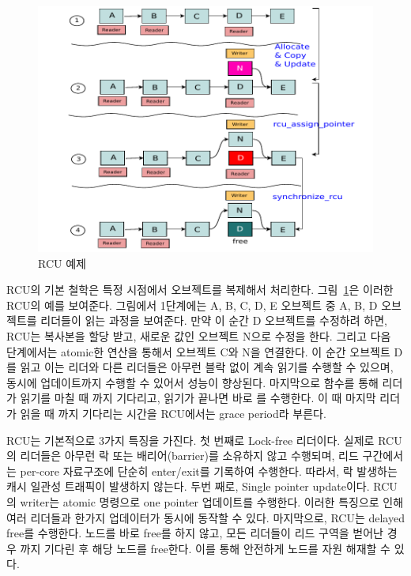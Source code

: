 \begin{figure}[h]
    \centering
    \includegraphics[width=1\textwidth]{fig/rcu/rcu_principle}
    \caption{RCU 예제}
  \label{fig:rcuprinciple}
\end{figure}


RCU의 기본 철학은 특정 시점에서 오브젝트를 복제해서 처리한다. 그림~\ref{fig:rcuprinciple}은 
이러한 RCU의 예를 보여준다.
그림에서 1단계에는 A, B, C, D, E 오브젝트 중 A, B, D 오브젝트를 리더들이 읽는 과정을 보여준다.
만약 이 순간 D 오브젝트를 수정하려 하면, RCU는 복사본을 할당 받고, 새로운 값인 오브젝트 N으로 수정을 한다.
그리고 다음 단계에서는 atomic한 연산을 통해서 오브젝트 C와 N을 연결한다. 
이 순간 오브젝트 D를 읽고 이는 리더와 다른 리더들은 아무런 블락 없이 계속 읽기를 수행할 수 있으며,
 동시에 업데이트까지 수행할 수 있어서 성능이 향상된다.
마지막으로  함수를 통해 리더가 읽기를 마칠 때 까지 기다리고, 읽기가 끝나면 
바로 를 수행한다. 
이 때 마지막 리더가 읽을 때 까지 기다리는 시간을 RCU에서는 grace period라 부른다. 


RCU는 기본적으로 3가지 특징을 가진다. 첫 번째로 Lock-free 리더이다.
실제로 RCU의 리더들은 아무런 락 또는 배리어(barrier)를 소유하지 않고 수행되며, 리드 구간에서는
 per-core 자료구조에 
단순히 enter/exit를 기록하여 수행한다. 
따라서, 락 발생하는 캐시 일관성 트래픽이 발생하지 않는다.
두번 째로, Single pointer update이다.
RCU의 writer는 atomic 명령으로 one pointer 업데이트를 수행한다.
이러한 특징으로 인해 여러 리더들과 한가지 업데이터가 동시에 동작할 수 있다.  
마지막으로, RCU는 delayed free를 수행한다.
노드를 바로 free를 하지 않고, 모든 리더들이 리드 구역을 벋어난 경우 까지 
기다린 후 해당 노드를 free한다.
이를 통해 안전하게 노드를 자원 해재할 수 있다. 

